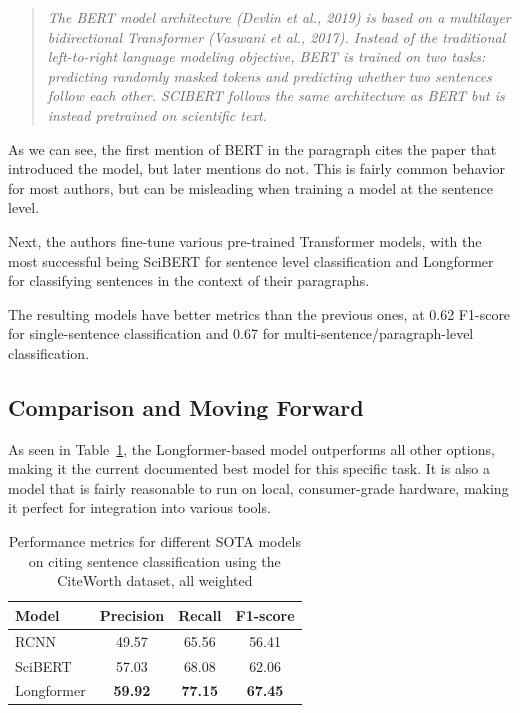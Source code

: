 \documentclass[12pt,a4paper]{report}
\begin{document}
\begin{quote}
    \textit{The BERT model architecture (Devlin et al., 2019) is based on a multilayer bidirectional Transformer (Vaswani et al., 2017). Instead of the traditional left-to-right language modeling objective, BERT is trained on two tasks: predicting randomly masked tokens and predicting whether two sentences follow each other. SCIBERT follows the same architecture as BERT but is instead pretrained on scientific text.}
\end{quote}

As we can see, the first mention of BERT \cite{devlin2019bertpretrainingdeepbidirectional} in the paragraph cites the paper that introduced the model, but later mentions do not. This is fairly common behavior for most authors, but can be misleading when training a model at the sentence level.

Next, the authors fine-tune various pre-trained Transformer \cite{vaswani2023attentionneed} models, with the most successful being SciBERT \cite{beltagy2019scibertpretrainedlanguagemodel} for sentence level classification and Longformer \cite{beltagy2020longformerlongdocumenttransformer} for classifying sentences in the context of their paragraphs. 

The resulting models have better metrics than the previous ones, at 0.62 F1-score for single-sentence classification and 0.67 for multi-sentence/paragraph-level classification.

\subsection{Comparison and Moving Forward}

As seen in Table~\ref{tab:citsent-metrics}, the Longformer-based \cite{beltagy2020longformerlongdocumenttransformer} model outperforms all other options, making it the current documented best model for this specific task. It is also a model that is fairly reasonable to run on local, consumer-grade hardware, making it perfect for integration into various tools.

\begin{table}[th]
\centering
\small
\setlength{\tabcolsep}{12pt}
\renewcommand{\arraystretch}{1.2}
\begin{tabular}{lccc}
\toprule
\textbf{Model} & \textbf{Precision} & \textbf{Recall} & \textbf{F1-score} \\
\midrule
RCNN & 49.57 & 65.56 & 56.41 \\
SciBERT & 57.03 & 68.08 & 62.06 \\
Longformer & \textbf{59.92} & \textbf{77.15} & \textbf{67.45} \\
\bottomrule
\end{tabular}
\caption{Performance metrics for different SOTA models on citing sentence classification using the CiteWorth dataset, all weighted}
\label{tab:citsent-metrics}
\end{table}
\end{document}
